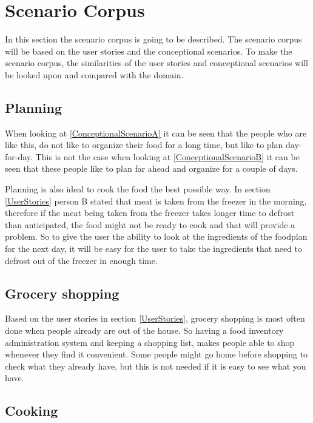 \section{Scenario Corpus}

In this section the scenario corpus is going to be described. The scenario corpus will be based on the user stories and the conceptional scenarios. To make the scenario corpus, the similarities of the user stories and conceptional scenarios will be looked upon and compared with the domain.

\subsection{Planning}

When looking at \ref{ConceptionalScenarioA} it can be seen that the people who are like this, do not like to organize their food for a long time, but like to plan day-for-day. This is not the case when looking at \ref{ConceptionalScenarioB} it can be seen that these people like to plan far ahead and organize for a couple of days.

Planning is also ideal to cook the food the best possible way. In section \ref{UserStories} person B stated that meat is taken from the freezer in the morning, therefore if the meat being taken from the freezer takes longer time to defrost than anticipated, the food might not be ready to cook and that will provide a problem. So to give the user the ability to look at the ingredients of the foodplan for the next day, it will be easy for the user to take the ingredients that need to defrost out of the freezer in enough time. 

\subsection{Grocery shopping}

Based on the user stories in section \ref{UserStories}, grocery shopping is most often done when people already are out of the house. So having a food inventory administration system and keeping a shopping list, makes people able to shop whenever they find it convenient. Some people might go home before shopping to check what they already have, but this is not needed if it is easy to see what you have.

\subsection{Cooking}


